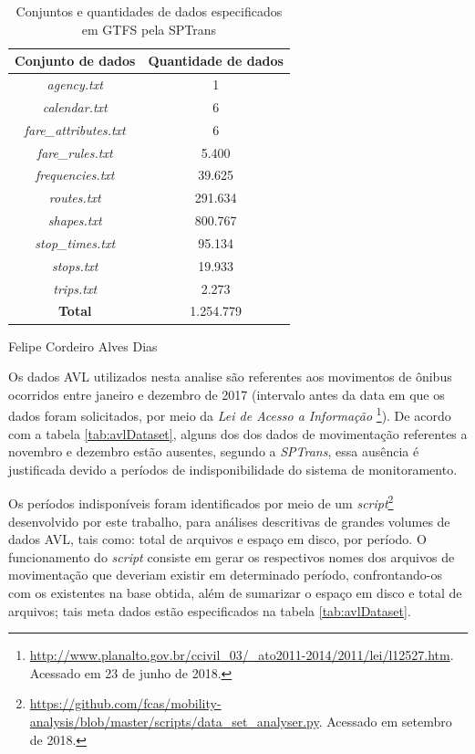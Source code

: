 \documentclass[
	12pt,				%
	oneside,			%
	a4paper,			%
	english,			%
	brazil				%
	]{abntex2ppgsi}
\begin{document}
\begin{table}[!htb]
\centering
\caption{Conjuntos e quantidades de dados especificados em GTFS pela SPTrans}
	\label{tab:gtfs}
\begin{tabular}{c|c}
\hline
\textbf{Conjunto de dados} & \textbf {Quantidade de dados} \\ 
\hline
\textit{agency.txt} & 1 \\ 
\hline
\textit{calendar.txt} & 6 \\ 
\hline
\textit{fare\_attributes.txt} & 6 \\ 
\hline
\textit{fare\_rules.txt} & 5.400 \\
\hline
\textit{frequencies.txt} & 39.625 \\
\hline
\textit{routes.txt} & 291.634 \\
\hline
\textit{shapes.txt} & 800.767 \\
\hline
\textit{stop\_times.txt} & 95.134 \\  
\hline
\textit{stops.txt} & 19.933 \\ 
\hline
\textit{trips.txt} & 2.273 \\
\hline
\hline
\textbf{Total} & 1.254.779 \\
\hline
\hline
\end{tabular}
 Felipe Cordeiro Alves Dias
\end{table}

Os dados AVL utilizados nesta analise são referentes aos movimentos de ônibus ocorridos entre janeiro e dezembro de 2017 (intervalo antes da data em que os dados foram solicitados, por meio da \textit{Lei de Acesso a Informação} \footnote{\url{http://www.planalto.gov.br/ccivil\_03/\_ato2011-2014/2011/lei/l12527.htm}. Acessado em 23 de junho de 2018.}). De acordo com a tabela \ref{tab:avlDataset}, alguns dos dos dados de movimentação referentes a novembro e dezembro estão ausentes, segundo a \textit{SPTrans}, essa ausência é justificada devido a períodos de indisponibilidade do sistema de monitoramento.

Os períodos indisponíveis foram identificados por meio de um \textit{script}\footnote{\url{https://github.com/fcas/mobility-analysis/blob/master/scripts/data_set_analyser.py}. Acessado em setembro de 2018.} desenvolvido por este trabalho, para análises descritivas de grandes volumes de dados AVL, tais como: total de arquivos e espaço em disco, por período. O funcionamento do \textit{script} consiste em gerar os respectivos nomes dos arquivos de movimentação que deveriam existir em determinado período, confrontando-os com os existentes na base obtida, além de sumarizar o espaço em disco e total de arquivos; tais meta dados estão especificados na tabela \ref{tab:avlDataset}.
\end{document}
